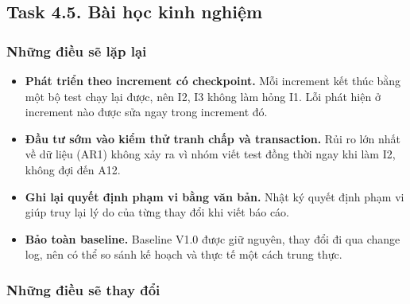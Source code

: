 \subsection{Task 4.5. Bài học kinh nghiệm}
\label{sec:t4-lessons}

\subsubsection{Những điều sẽ lặp lại}

\begin{itemize}
    \item \textbf{Phát triển theo increment có checkpoint.} Mỗi increment kết thúc bằng một bộ test chạy lại được, nên I2, I3 không làm hỏng I1. Lỗi phát hiện ở increment nào được sửa ngay trong increment đó.
    \item \textbf{Đầu tư sớm vào kiểm thử tranh chấp và transaction.} Rủi ro lớn nhất về dữ liệu (AR1) không xảy ra vì nhóm viết test đồng thời ngay khi làm I2, không đợi đến A12.
    \item \textbf{Ghi lại quyết định phạm vi bằng văn bản.} Nhật ký quyết định phạm vi giúp truy lại lý do của từng thay đổi khi viết báo cáo.
    \item \textbf{Bảo toàn baseline.} Baseline V1.0 được giữ nguyên, thay đổi đi qua change log, nên có thể so sánh kế hoạch và thực tế một cách trung thực.
\end{itemize}

\subsubsection{Những điều sẽ thay đổi}


